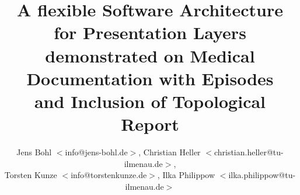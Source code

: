 %
%
%
%
%
%
%

\title{
    A flexible Software Architecture for Presentation Layers\\
    demonstrated on Medical Documentation with Episodes\\
    and Inclusion of Topological Report
}
\author{
    Jens Bohl \(<\)info@jens-bohl.de\(>\),
    Christian Heller \(<\)christian.heller@tu-ilmenau.de\(>\),\\
    Torsten Kunze \(<\)info@torstenkunze.de\(>\),
    Ilka Philippow \(<\)ilka.philippow@tu-ilmenau.de\(>\)
}

